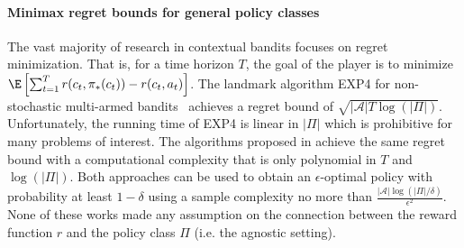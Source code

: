 \documentclass{article}
\newcommand{\mc}[1]{\mathcal{#1}}
\newcommand{\1}{\mathbf{1}}
\renewcommand{\v}{r} %
\begin{document}
\paragraph{Minimax regret bounds for general policy classes}
The vast majority of research in contextual bandits focuses on regret minimization.
That is, for a time horizon $T$, the goal of the player is to minimize $\E\left[ \sum_{t=1}^T \v(c_t,\pi_{\ast}(c_t)) - \v(c_t,a_t) \right]$.
The landmark algorithm EXP4 for non-stochastic multi-armed bandits~\cite{auer2002nonstochastic} achieves a regret bound of $\sqrt{ |\mc{A}| T \log(|\Pi|)}$. 
Unfortunately, the running time of EXP4 is linear in $|\Pi|$ which is prohibitive for many problems of interest. The algorithms proposed in \cite{dudik2011efficient,agarwal2014taming}  achieve the same regret bound with a computational complexity that is only polynomial in $T$ and $\log(|\Pi|)$.
Both approaches can be used to obtain an $\epsilon$-optimal policy with probability at least $1-\delta$ using a sample complexity no more than $\frac{ |\mc{A}| \log(|\Pi| /\delta)}{\epsilon^2}$.
None of these works made any assumption on the connection between the reward function $\v$ and the policy class $\Pi$ (i.e. the agnostic setting). \vspace{-10pt}
\end{document}
